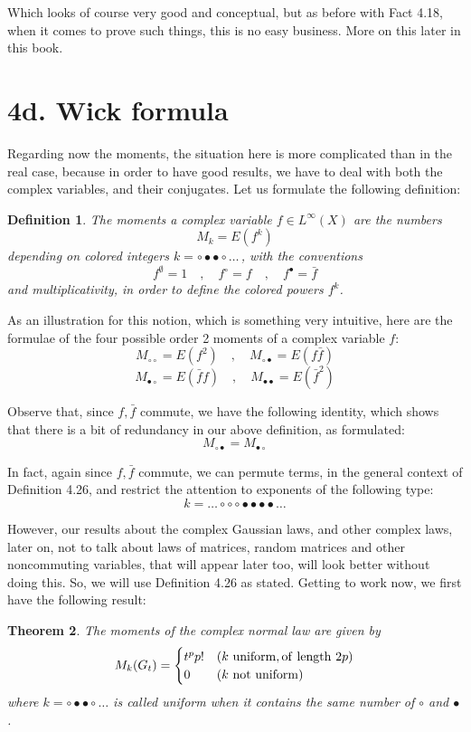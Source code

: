 \documentclass[12pt]{amsbook}
\newtheorem{theorem}{Theorem}[chapter]
\newtheorem{definition}[theorem]{Definition}
\begin{document}
Which looks of course very good and conceptual, but as before with Fact 4.18, when it comes to prove such things, this is no easy business. More on this later in this book.

\section*{4d. Wick formula}

Regarding now the moments, the situation here is more complicated than in the real case, because in order to have good results, we have to deal with both the complex variables, and their conjugates. Let us formulate the following definition:


\begin{definition}
The moments a complex variable $f\in L^\infty(X)$ are the numbers
$$M_k=E(f^k)$$
depending on colored integers $k=\circ\bullet\bullet\circ\ldots\,$, with the conventions
$$f^\emptyset=1\quad,\quad f^\circ=f\quad,\quad f^\bullet=\bar{f}$$
and multiplicativity, in order to define the colored powers $f^k$.
\end{definition}

As an illustration for this notion, which is something very intuitive, here are the formulae of the four possible order 2 moments of a complex variable $f$:
$$M_{\circ\circ}=E(f^2)\quad,\quad M_{\circ\bullet}=E(f\bar{f})$$
$$M_{\bullet\circ}=E(\bar{f}f)\quad,\quad M_{\bullet\bullet}=E(\bar{f}^2)$$

Observe that, since $f,\bar{f}$ commute, we have the following identity, which shows that there is a bit of redundancy in our above definition, as formulated:
$$M_{\circ\bullet}=M_{\bullet\circ}$$

In fact, again since $f,\bar{f}$ commute, we can permute terms, in the general context of Definition 4.26, and restrict the attention to exponents of the following type:
$$k=\ldots\circ\circ\circ\bullet\bullet\bullet\bullet\ldots$$

However, our results about the complex Gaussian laws, and other complex laws, later on, not to talk about laws of matrices, random matrices and other noncommuting variables, that will appear later too, will look better without doing this. So, we will use Definition 4.26 as stated. Getting to work now, we first have the following result:

\begin{theorem}
The moments of the complex normal law are given by
$$M_k(G_t)=\begin{cases}
t^pp!&(k\ {\rm uniform, of\ length}\ 2p)\\
0&(k\ {\rm not\ uniform})
\end{cases}$$
where $k=\circ\bullet\bullet\circ\ldots$ is called uniform when it contains the same number of $\circ$ and $\bullet$.
\end{theorem}
\end{document}
